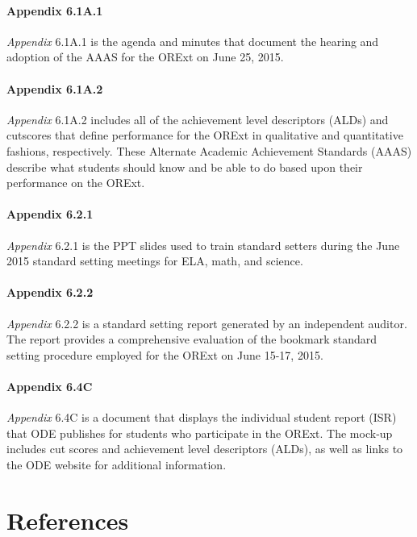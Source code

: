 \documentclass[]{article}
\let\oldparagraph\paragraph
\renewcommand{\paragraph}[1]{\oldparagraph{#1}\mbox{}}
\begin{document}
\paragraph{Appendix 6.1A.1}\label{appendix-6.1a.1}

\emph{Appendix} 6.1A.1 is the agenda and minutes that document the
hearing and adoption of the AAAS for the ORExt on June 25, 2015.

\paragraph{Appendix 6.1A.2}\label{appendix-6.1a.2}

\emph{Appendix} 6.1A.2 includes all of the achievement level descriptors
(ALDs) and cutscores that define performance for the ORExt in
qualitative and quantitative fashions, respectively. These Alternate
Academic Achievement Standards (AAAS) describe what students should know
and be able to do based upon their performance on the ORExt.

\paragraph{Appendix 6.2.1}\label{appendix-6.2.1}

\emph{Appendix} 6.2.1 is the PPT slides used to train standard setters
during the June 2015 standard setting meetings for ELA, math, and
science.

\paragraph{Appendix 6.2.2}\label{appendix-6.2.2}

\emph{Appendix} 6.2.2 is a standard setting report generated by an
independent auditor. The report provides a comprehensive evaluation of
the bookmark standard setting procedure employed for the ORExt on June
15-17, 2015.

\paragraph{Appendix 6.4C}\label{appendix-6.4c}

\emph{Appendix} 6.4C is a document that displays the individual student
report (ISR) that ODE publishes for students who participate in the
ORExt. The mock-up includes cut scores and achievement level descriptors
(ALDs), as well as links to the ODE website for additional information.

\newpage

\section{References}\label{references}
\end{document}
